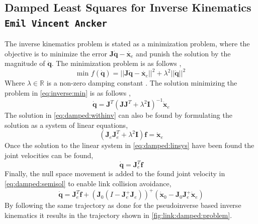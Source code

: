 \documentclass[../main.tex]{subfiles}
\begin{document}
\subsection{Damped Least Squares for Inverse Kinematics   \\ \normalfont\normalsize\texttt{Emil Vincent Ancker}}
The inverse kinematics problem is stated as a minimization problem, where the objective is to minimize the error $\boldsymbol{J}\dot{\boldsymbol{q}} - \dot{\boldsymbol{x}_e}$ and punish the solution by the magnitude of $\dot{\boldsymbol{q}}$. The minimization problem is as follows \cite{buss_introduction_nodate},
\begin{equation} \label{eq:inverse:min}
    \text{min } f(\dot{\boldsymbol{q}}) = ||\boldsymbol{J}\dot{\boldsymbol{q}} - \dot{\boldsymbol{x}_e}||^2 + \lambda^2||\dot{\boldsymbol{q}}||^2
\end{equation}
Where $\lambda \in \mathbb{R}$ is a non-zero damping constant \cite{buss_introduction_nodate}. The solution minimizing the problem in \autoref{eq:inverse:min} is as follows \cite{buss_introduction_nodate},
\begin{equation} \label{eq:damped:withinv}
    \dot{\boldsymbol{q}} = \boldsymbol{J}^T(\boldsymbol{J}\boldsymbol{J}^T + \lambda^2\boldsymbol{I})^{-1}\dot{\boldsymbol{x}}_e
\end{equation}
The solution in \autoref{eq:damped:withinv} can also be found by formulating the solution as a system of linear equations,
\begin{equation} \label{eq:damped:linsys}
    (\boldsymbol{J}_e \boldsymbol{J}_e^T + \lambda^2 \boldsymbol{I})\boldsymbol{f} = \dot{\boldsymbol{x}}_e
\end{equation}
Once the solution to the linear system in \autoref{eq:damped:linsys} have been found the joint velocities can be found,
\begin{equation} \label{eq:damped:semisol}
    \dot{\boldsymbol{q}} = \boldsymbol{J}_e^T \boldsymbol{f}
\end{equation}
Finally, the null space movement is added to the found joint velocity in \autoref{eq:damped:semisol} to enable link collision avoidance,
\begin{equation} \label{eq:damped:solution}
    \dot{\boldsymbol{q}} = \boldsymbol{J}_e^T \boldsymbol{f} +\left(\boldsymbol{J}_0(I-\boldsymbol{J}_e^+\boldsymbol{J}_e)\right)^+(\dot{\boldsymbol{x}}_0 - \boldsymbol{J}_0\boldsymbol{J}_e^+\dot{\boldsymbol{x}}_e)
\end{equation}
By following the same trajectory as done for the pseudoinverse based inverse kinematics it results in the trajectory shown in \autoref{fig:link:damped:problem}.
\end{document}
